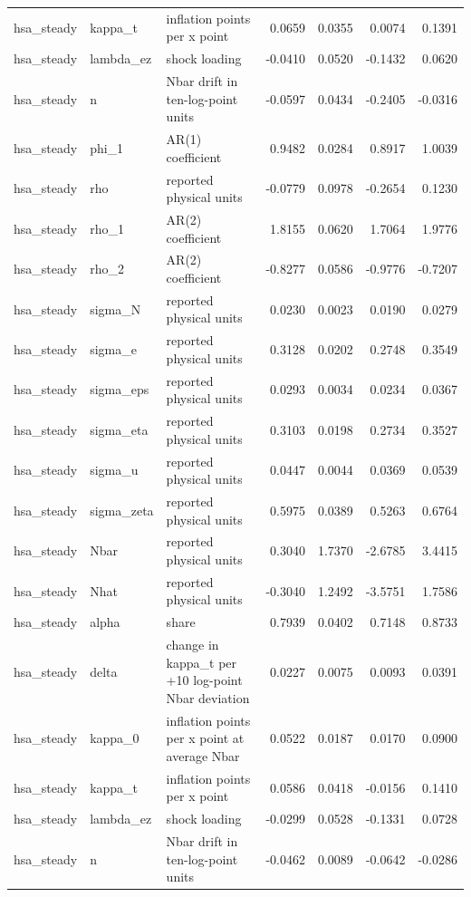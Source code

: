 \begin{tabular}{lllrrrr}
hsa\_steady & kappa\_t & inflation points per x point & 0.0659 & 0.0355 & 0.0074 & 0.1391 \\
hsa\_steady & lambda\_ez & shock loading & -0.0410 & 0.0520 & -0.1432 & 0.0620 \\
hsa\_steady & n & Nbar drift in ten-log-point units & -0.0597 & 0.0434 & -0.2405 & -0.0316 \\
hsa\_steady & phi\_1 & AR(1) coefficient & 0.9482 & 0.0284 & 0.8917 & 1.0039 \\
hsa\_steady & rho & reported physical units & -0.0779 & 0.0978 & -0.2654 & 0.1230 \\
hsa\_steady & rho\_1 & AR(2) coefficient & 1.8155 & 0.0620 & 1.7064 & 1.9776 \\
hsa\_steady & rho\_2 & AR(2) coefficient & -0.8277 & 0.0586 & -0.9776 & -0.7207 \\
hsa\_steady & sigma\_N & reported physical units & 0.0230 & 0.0023 & 0.0190 & 0.0279 \\
hsa\_steady & sigma\_e & reported physical units & 0.3128 & 0.0202 & 0.2748 & 0.3549 \\
hsa\_steady & sigma\_eps & reported physical units & 0.0293 & 0.0034 & 0.0234 & 0.0367 \\
hsa\_steady & sigma\_eta & reported physical units & 0.3103 & 0.0198 & 0.2734 & 0.3527 \\
hsa\_steady & sigma\_u & reported physical units & 0.0447 & 0.0044 & 0.0369 & 0.0539 \\
hsa\_steady & sigma\_zeta & reported physical units & 0.5975 & 0.0389 & 0.5263 & 0.6764 \\
hsa\_steady & Nbar & reported physical units & 0.3040 & 1.7370 & -2.6785 & 3.4415 \\
hsa\_steady & Nhat & reported physical units & -0.3040 & 1.2492 & -3.5751 & 1.7586 \\
hsa\_steady & alpha & share & 0.7939 & 0.0402 & 0.7148 & 0.8733 \\
hsa\_steady & delta & change in kappa\_t per +10 log-point Nbar deviation & 0.0227 & 0.0075 & 0.0093 & 0.0391 \\
hsa\_steady & kappa\_0 & inflation points per x point at average Nbar & 0.0522 & 0.0187 & 0.0170 & 0.0900 \\
hsa\_steady & kappa\_t & inflation points per x point & 0.0586 & 0.0418 & -0.0156 & 0.1410 \\
hsa\_steady & lambda\_ez & shock loading & -0.0299 & 0.0528 & -0.1331 & 0.0728 \\
hsa\_steady & n & Nbar drift in ten-log-point units & -0.0462 & 0.0089 & -0.0642 & -0.0286 \\

\end{tabular}
